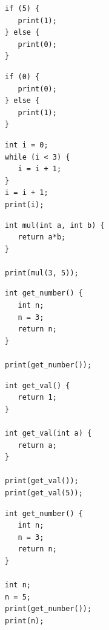 \begin{lstlisting}[frame=htrbl, caption={Implementation of {\ttfamily if-else\_other\_true.e}}, label={lst:ifElseOtherTrue}, basicstyle=\footnotesize]
if (5) {
   print(1);
} else {
   print(0);
}
\end{lstlisting}

\begin{lstlisting}[frame=htrbl, caption={Implementation of {\ttfamily if-else\_zero\_false.e}}, label={lst:ifElseZeroFalse}, basicstyle=\footnotesize]
if (0) {
   print(0);
} else {
   print(1);
}
\end{lstlisting}

\begin{lstlisting}[frame=htrbl, caption={Implementation of {\ttfamily while.e}}, label={lst:while}, basicstyle=\footnotesize]
int i = 0;
while (i < 3) {
   i = i + 1;
}
i = i + 1;
print(i);
\end{lstlisting}

\begin{lstlisting}[frame=htrbl, caption={Implementation of {\ttfamily current\_formal\_parameter.e}}, label={lst:currentFormalParameter}, basicstyle=\footnotesize]
int mul(int a, int b) {
   return a*b;
}

print(mul(3, 5));
\end{lstlisting}

\begin{lstlisting}[frame=htrbl, caption={Implementation of {\ttfamily local\_parameter.e}}, label={lst:localParameter}, basicstyle=\footnotesize]
int get_number() {
   int n;
   n = 3;
   return n;
}

print(get_number());
\end{lstlisting}

\begin{lstlisting}[frame=htrbl, caption={Implementation of {\ttfamily overloading.e}}, label={lst:overloading}, basicstyle=\footnotesize]
int get_val() {
   return 1;
}

int get_val(int a) {
   return a;
}

print(get_val());
print(get_val(5));
\end{lstlisting}

\begin{lstlisting}[frame=htrbl, caption={Implementation of {\ttfamily scope.e}}, label={lst:scope}, basicstyle=\footnotesize]
int get_number() {
   int n;
   n = 3;
   return n;
}

int n;
n = 5;
print(get_number());
print(n);
\end{lstlisting}

